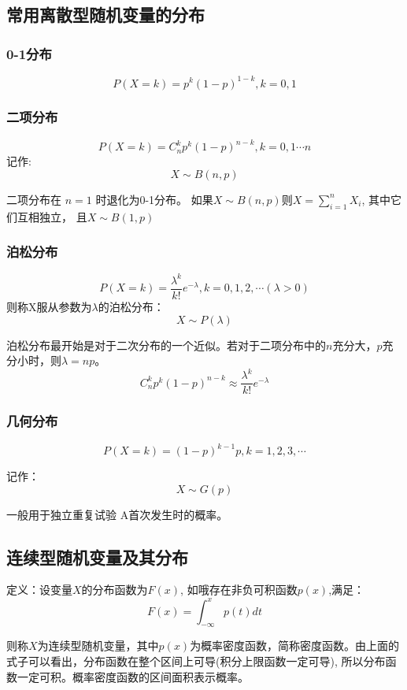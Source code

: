 \documentclass[10pt, a4paper]{article}
\begin{document}
        \subsection{常用离散型随机变量的分布}
            \subsubsection{0-1分布}
            $$P(X = k) = p^k(1 - p)^{1 - k}, k = 0, 1$$
            \subsubsection{二项分布}
            $$P(X = k) = C_n^kp^k(1 - p)^{n - k}, k = 0, 1 \cdots n$$
            记作:
            $$ X  \sim B(n, p) $$

            二项分布在 $n = 1$ 时退化为0-1分布。 如果$X \sim B(n, p)$则$X = \sum_{i = 1}^nX_i$, 其中它们互相独立， 且$X \sim B(1, p)$
        \subsubsection{泊松分布}
        $$P(X = k) = \frac{\lambda^k}{k!}e^{-\lambda}, k = 0, 1, 2, \cdots (\lambda > 0) $$
            则称X服从参数为$\lambda$的泊松分布：
            $$X \sim P(\lambda)$$

            泊松分布最开始是对于二次分布的一个近似。若对于二项分布中的$n$充分大，$p$充分小时，则$\lambda = np$。
            $$C_n^kp^k(1-p)^{n - k} \approx \frac{\lambda^k}{k!}e^{-\lambda}$$
        \subsubsection{几何分布}
            $$P(X = k) = (1 - p)^{k - 1}p, k = 1, 2, 3, \cdots$$
            
            记作：
            $$X \sim G(p)$$

            一般用于独立重复试验 A首次发生时的概率。
    \subsection{连续型随机变量及其分布}
        定义：设变量$X$的分布函数为$F(x)$, 如哦存在非负可积函数$p(x)$,满足：
        $$F(x) = \int_{-\infty}^{x}p(t)dt$$
        
        则称$X$为连续型随机变量，其中$p(x)$为概率密度函数，简称密度函数。由上面的式子可以看出，分布函数在整个区间上可导(积分上限函数一定可导), 所以分布函数一定可积。概率密度函数的区间面积表示概率。
    
\end{document}
